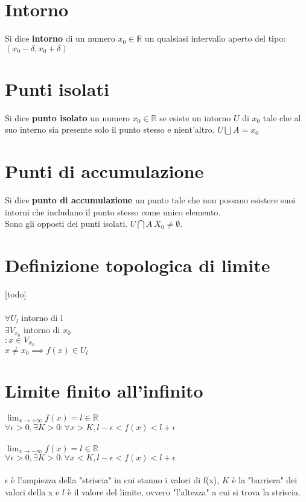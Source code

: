 \documentclass{article}
\begin{document}
\section{Intorno}
Si dice \textbf{intorno} di un numero \(x_0 \in \mathbb{R}\) un qualsiasi intervallo aperto del tipo:\\
\((x_0 - \delta, x_0 + \delta)\)

\section{Punti isolati}
Si dice \textbf{punto isolato} un numero \(x_0 \in \mathbb{R}\) se esiste un intorno \(U\) di \(x_0\) tale che al suo interno sia presente solo il punto stesso e nient'altro.
\(U \bigcup A = {x_0}\)

\section{Punti di accumulazione}
Si dice \textbf{punto di accumulazione} un punto tale che non possano esistere suoi intorni che includano il punto stesso come unico elemento.\\
Sono gli opposti dei punti isolati.
\(U \bigcap A \ {X_0} \neq \emptyset\).

\section{Definizione topologica di limite}
[todo]\\\\
\(\forall U_l\) intorno di l\\
\(\exists V_{x_0}\) intorno di \(x_0\)\\
\(: x \in V_{x_0}\)\\
\(x \neq x_0 \implies f(x) \in U_l\)

\section{Limite finito all'infinito}
\(\lim_{x \to +\infty} f(x) = l \in \mathbb{R}\)\\
\(\forall \epsilon > 0, \exists K > 0 : \forall x > K, l - \epsilon < f(x) < l + \epsilon\)\\\\
\(\lim_{x \to -\infty} f(x) = l \in \mathbb{R}\)\\
\(\forall \epsilon > 0, \exists K > 0 : \forall x < K, l - \epsilon < f(x) < l + \epsilon\)\\\\
\(\epsilon\) è l'ampiezza della "striscia" in cui stanno i valori di f(x), \(K\) è la "barriera" dei valori della x e \(l\) è il valore del limite, ovvero "l'altezza" a cui si trova la striscia.
\end{document}

